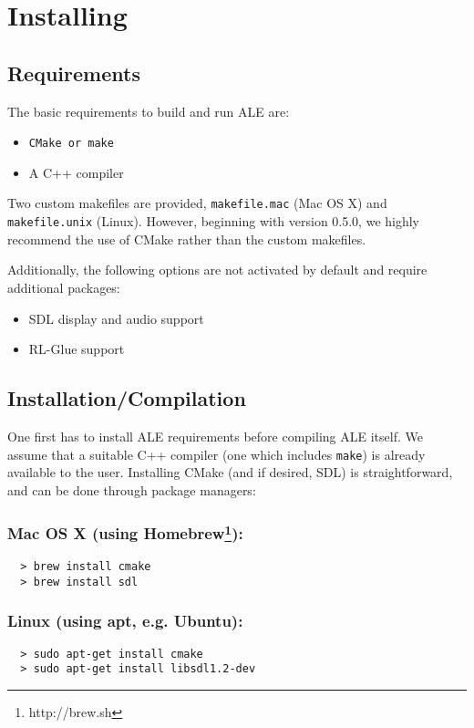 \documentclass[12pt]{article}
\begin{document}
\section{Installing}\label{sec:install}

\subsection{Requirements}

The basic requirements to build and run ALE are:

\begin{itemize}
  \item \verb+CMake or make+
  \item A C++ compiler
\end{itemize}

Two custom makefiles are provided, \verb+makefile.mac+ (Mac OS X) and \verb+makefile.unix+ (Linux). However, beginning with version 0.5.0, we highly recommend the use of CMake rather than the custom makefiles.

Additionally, the following options are not activated by default and require additional packages:
\begin{itemize}
  \item SDL display and audio support
  \item RL-Glue support
\end{itemize}

\subsection{Installation/Compilation}\label{subsec:installation_compilation}

One first has to install ALE requirements before compiling ALE itself. 
We assume that a suitable C++ compiler (one which includes \verb+make+) is already available to 
the user. Installing CMake (and if desired, SDL) is straightforward, and can be done through 
package managers: 

\subsubsection*{Mac OS X (using Homebrew\footnote{http://brew.sh}):}
\begin{verbatim}
  > brew install cmake
  > brew install sdl
\end{verbatim}

\subsubsection*{Linux (using apt, e.g. Ubuntu):}
\begin{verbatim}
  > sudo apt-get install cmake
  > sudo apt-get install libsdl1.2-dev
\end{verbatim}
\end{document}
